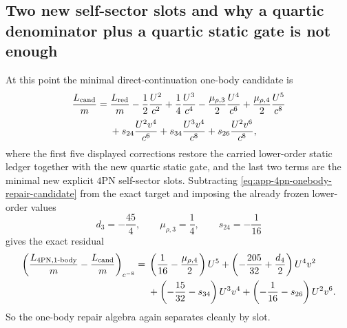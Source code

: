\documentclass[11pt]{article}
\begin{document}
\subsection{Two new self-sector slots and why a quartic denominator plus a quartic static gate is not enough}
\label{app:onebody-repair-self}

At this point the minimal direct-continuation one-body candidate is
\begin{equation}
\begin{aligned}
\frac{L_{\rm cand}}{m}
={}&
\frac{L_{\rm red}}{m}
-\frac12\frac{U^2}{c^2}
+\frac14\frac{U^3}{c^4}
-\frac{\mu_{\rho,3}}{2}\frac{U^4}{c^6}
+\frac{\mu_{\rho,4}}{2}\frac{U^5}{c^8}
\\[0.5ex]
&
+s_{24}\frac{U^2v^4}{c^6}
+s_{34}\frac{U^3v^4}{c^8}
+s_{26}\frac{U^2v^6}{c^8},
\end{aligned}
\label{eq:app-4pn-onebody-repair-candidate}
\end{equation}
where the first five displayed corrections restore the carried lower-order
static ledger together with the new quartic static gate, and the last two terms
are the minimal new explicit $4$PN self-sector slots.  Subtracting
\eqref{eq:app-4pn-onebody-repair-candidate} from the exact target and imposing
the already frozen lower-order values
\begin{equation}
\boxed{
 d_3=-\frac{45}{4},
 \qquad
 \mu_{\rho,3}=\frac14,
 \qquad
 s_{24}=-\frac1{16}
 }
\label{eq:app-4pn-onebody-repair-carried-lower-order-ledger}
\end{equation}
gives the exact residual
\begin{equation}
\begin{aligned}
\left(\frac{L_{4\mathrm{PN},1\text{-body}}}{m}-\frac{L_{\rm cand}}{m}\right)_{c^{-8}}
={}&
\left(\frac1{16}-\frac{\mu_{\rho,4}}{2}\right)U^5
+\left(-\frac{205}{32}+\frac{d_4}{2}\right)U^4v^2
\\
&+
\left(-\frac{15}{32}-s_{34}\right)U^3v^4
+\left(-\frac1{16}-s_{26}\right)U^2v^6.
\end{aligned}
\label{eq:app-4pn-onebody-repair-residual}
\end{equation}
So the one-body repair algebra again separates cleanly by slot.
\end{document}

